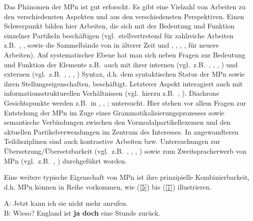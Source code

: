 Das Phänomen der MPn ist gut erforscht. Es gibt eine Vielzahl von Arbeiten zu den verschiedensten Aspekten und aus den verschiedensten Perspektiven. Einen Schwerpunkt bilden hier Arbeiten, die sich mit der Bedeutung und Funktion einzelner Partikeln beschäftigen (vgl.\ stellvertretend für zahlreiche Arbeiten z.B.\ \citealt{Franck1980}, \citealt{Hentschel1986}, \citealt{Thurmair1989} sowie die Sammelbände von \citealt{Weydt1977, Weydt1979, Weydt1983a, Weydt1986} in älterer Zeit und \citealt{Karagjosova2003, Karagjosova2004}, \citealt{Zimmermann2011}, \citealt{Egg2013}, \citealt{Mueller2014a, Mueller2016a}, \citealt{Gutzmann2015} für neuere Arbeiten). Auf systematischer Ebene hat man sich neben Fragen zur Bedeutung und Funktion der Elemente z.B.\ auch mit ihrer internen (vgl.\ z.B.\ \citealt[50--63]{Meibauer1994}, \citealt[37--41]{Ormelius-Sandblom1997}, \citealt[99--104]{Coniglio2011}, \citealt{Struckmeier2014}) und externen (vgl.\ z.B.\ \citealt[32--36, 43--45]{Ormelius-Sandblom1997}, \citealt[104--115]{Coniglio2011}, \citealt{Abraham1995, Abraham2012}, \citealt{Gutzmann2016}) Syntax, d.h. dem syntaktischen Status der MPn sowie ihren Stellungseigenschaften, beschäftigt. Letz\-terer Aspekt interagiert auch mit informationsstrukturellen Verhältnissen (vgl.\ hierzu z.B.\ \citealt[73--87]{Meibauer1994}, \citealt[101--115]{Ormelius-Sandblom1997}). Diachrone Gesichtspunkte werden z.B.\ in \citet[Kapitel 3]{Hentschel1986}, \citet[158--170]{Meibauer1994}, \citet[Kapitel 4.2]{Diewald1997}; \citeyearpar{ Diewald2008} untersucht. Hier stehen vor allem Fragen zur Entstehung der MPn im Zuge eines Grammatikalisierungsprozesses sowie semantische Verbindungen zwischen den Vormodalpartikellexemen und den aktuellen Partikelverwendungen im Zentrum des Interesses. In angewandteren Teildisziplinen sind auch kontrastive Arbeiten bzw. Untersuchungen zur Übersetzung\slash Übersetzbarkeit (vgl.\ z.B.\ \citealt{Schubiger1965}, \citealt{Burkhardt1995}, \citealt{Masi1996}, \citealt{Diewald2010}) sowie zum Zweitspracherwerb von MPn (vgl.\ z.B.\ \citealt{Rost-Roth1999}, \citealt{Moellering2004}) durchgeführt worden.

Eine weitere typische Eigenschaft von MPn ist ihre prinzipielle Kombinierbarkeit, d.h. MPn können in Reihe vorkommen, wie (\ref{5}) bis (\ref{7}) illustrieren. 

\begin{exe}
	\ex\label{5} 
		A: Jetzt kann ich sie nicht mehr anrufen. \\
		B: Wieso? England ist \textbf{ja doch} eine Stunde zurück.
\end{exe}

